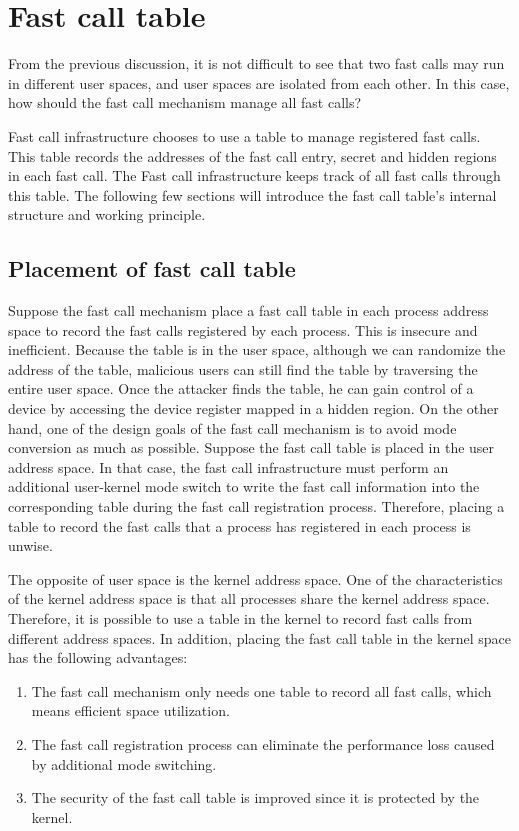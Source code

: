 \section{Fast call table}
From the previous discussion, it is not difficult to see that two fast calls may run in different user spaces, and user spaces are isolated from each other. In this case, how should the fast call mechanism manage all fast calls? 

Fast call infrastructure chooses to use a table to manage registered fast calls. This table records the addresses of the fast call entry, secret and hidden regions in each fast call. The Fast call infrastructure keeps track of all fast calls through this table. 
The following few sections will introduce the fast call table's internal structure and working principle. 

\subsection{Placement of fast call table}
Suppose the fast call mechanism place a fast call table in each process address space to record the fast calls registered by each process. This is insecure and inefficient. Because the table is in the user space, although we can randomize the address of the table, malicious users can still find the table by traversing the entire user space. Once the attacker finds the table,  he can gain control of a device by accessing the device register mapped in a hidden region.
On the other hand, one of the design goals of the fast call mechanism is to avoid mode conversion as much as possible. Suppose the fast call table is placed in the user address space. In that case, the fast call infrastructure must perform an additional user-kernel mode switch to write the fast call information into the corresponding table during the fast call registration process. Therefore, placing a table to record the fast calls that a process has registered in each process is unwise.

The opposite of user space is the kernel address space. One of the characteristics of the kernel address space is that all processes share the kernel address space. Therefore, it is possible to use a table in the kernel to record fast calls from different address spaces.
In addition, placing the fast call table in the kernel space has the following advantages:
\begin{enumerate}
  \item The fast call mechanism only needs one table to record all fast calls, which means efficient space utilization.
  \item The fast call registration process can eliminate the performance loss caused by additional mode switching.
  \item The security of the fast call table is improved since it is protected by the kernel.
\end{enumerate}

